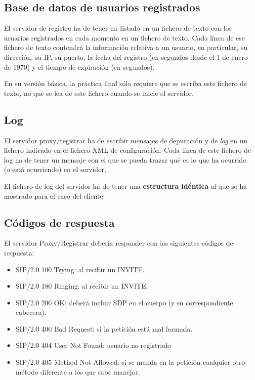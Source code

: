 \documentclass[a4paper,11pt]{article}
\begin{document}
\subsection{Base de datos de usuarios registrados}

El servidor de registro ha de tener un listado en un fichero de texto con los usuarios registrados en cada momento en un fichero de texto. Cada línea de ese fichero de texto contendrá la información relativa a un usuario, en particular, su dirección, su IP, su puerto, la fecha del registro (en segundos desde el 1 de enero de 1970) y el tiempo de expiración (en segundos).

En su versión básica, la práctica final sólo requiere que se escriba este fichero de texto, no que se lea de este fichero cuando se inicie el servidor.

\subsection{Log}


El servidor proxy/registrar ha de escribir mensajes de depuración y de \emph{log} en un fichero indicado en el fichero XML de configuración. Cada línea de este fichero de log ha de tener un mensaje con el que se pueda trazar qué es lo que ha ocurrido (o está ocurriendo) en el servidor.

El fichero de log del servidor ha de tener una {\bf estructura idéntica} al que se
ha mostrado para el caso del cliente.

\subsection{Códigos de respuesta}

El servidor Proxy/Registrar debería responder con los siguientes códigos
de respuesta:

   \begin{itemize}
     \item SIP/2.0 100 Trying: al recibir un INVITE.
     \item SIP/2.0 180 Ringing: al recibir un INVITE.
     \item SIP/2.0 200 OK: deberá incluir SDP en el cuerpo (y su correspondiente cabecera).
     \item SIP/2.0 400 Bad Request: si la petición está mal formada.
     \item SIP/2.0 404 User Not Found: usuario no registrado
     \item SIP/2.0 405 Method Not Allowed: si se manda en la petición cualquier otro método diferente a los que sabe manejar.
   \end{itemize}
\end{document}
